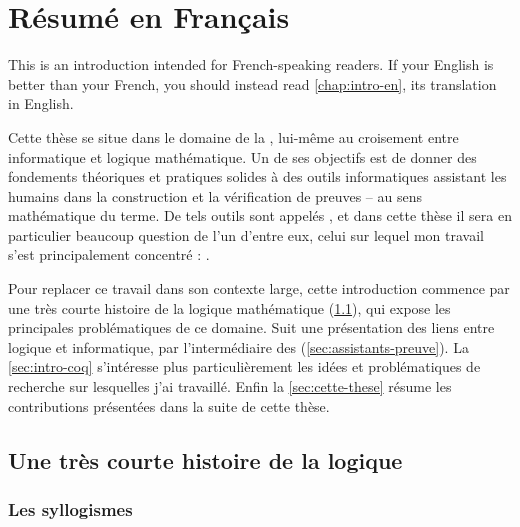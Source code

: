 \chapter{Résumé en Français}
\label{chap:intro-fr}

\margintoc

\begin{kaobox}[backgroundcolor=Black!10!White,frametitlebackgroundcolor=Black!10!White]
  This  is an introduction intended for French-speaking readers.
  If your English is better than your French,
  you should instead read \cref{chap:intro-en}, its translation in English.
\end{kaobox}

Cette thèse se situe dans le domaine de la , lui-même au croisement entre informatique et logique mathématique.
Un de ses objectifs est de donner des fondements théoriques et pratiques solides
à des outils informatiques assistant les humains dans la construction
et la vérification de preuves – au sens mathématique du terme.
De tels outils sont appelés , et dans cette thèse il sera
en particulier beaucoup question de l’un d’entre eux, celui
sur lequel mon travail s’est principalement concentré : .

Pour replacer ce travail dans son contexte large, cette introduction
commence par une très courte histoire de la logique mathématique
(\cref{sec:logique-histoire}), qui expose les principales problématiques de ce domaine.
Suit une présentation des liens entre logique et informatique, par
l’intermédiaire des  (\cref{sec:assistants-preuve}).
La \cref{sec:intro-coq} s’intéresse plus particulièrement les idées et problématiques
de recherche sur lesquelles j’ai travaillé.
Enfin la \cref{sec:cette-these} résume les contributions présentées dans la suite de cette
thèse.

\section{Une très courte histoire de la logique}
\label{sec:logique-histoire}

\subsection{Les syllogismes}

